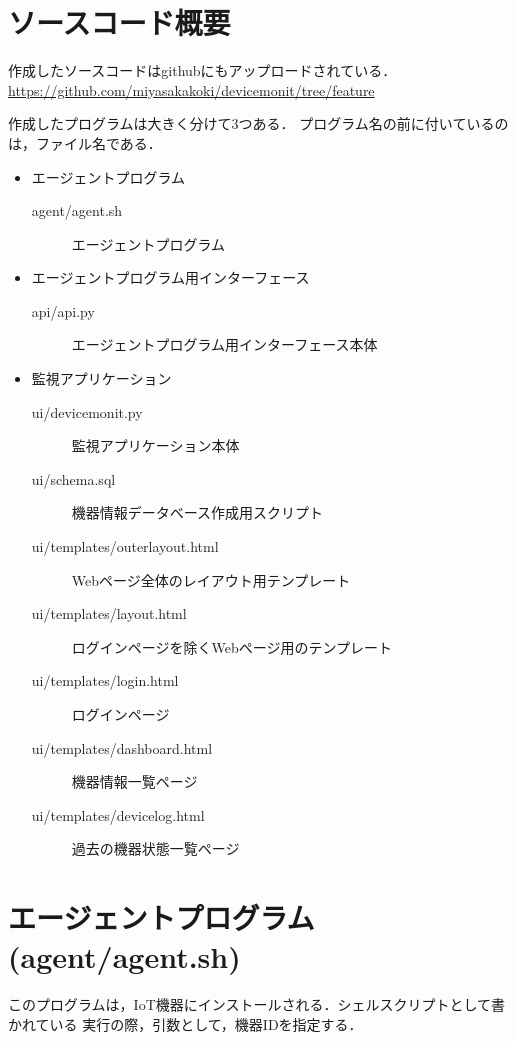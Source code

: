 \section*{ソースコード概要}
作成したソースコードはgithubにもアップロードされている．
\url{https://github.com/miyasakakoki/devicemonit/tree/feature}

作成したプログラムは大きく分けて3つある．
プログラム名の前に付いているのは，ファイル名である．
\begin{itemize}
\item エージェントプログラム\\
	\begin{description}
		\item[agent/agent.sh] エージェントプログラム
	\end{description}
\item エージェントプログラム用インターフェース\\
	\begin{description}
		\item[api/api.py] エージェントプログラム用インターフェース本体
	\end{description}
\item 監視アプリケーション\\
	\begin{description}
		\item[ui/devicemonit.py] 監視アプリケーション本体
		\item[ui/schema.sql] 機器情報データベース作成用スクリプト
		\item[ui/templates/outerlayout.html] Webページ全体のレイアウト用テンプレート
		\item[ui/templates/layout.html] ログインページを除くWebページ用のテンプレート
		\item[ui/templates/login.html] ログインページ
		\item[ui/templates/dashboard.html] 機器情報一覧ページ
		\item[ui/templates/devicelog.html] 過去の機器状態一覧ページ
	\end{description}
\end{itemize}


\section*{エージェントプログラム(agent/agent.sh)}
このプログラムは，IoT機器にインストールされる．シェルスクリプトとして書かれている
実行の際，引数として，機器IDを指定する．


